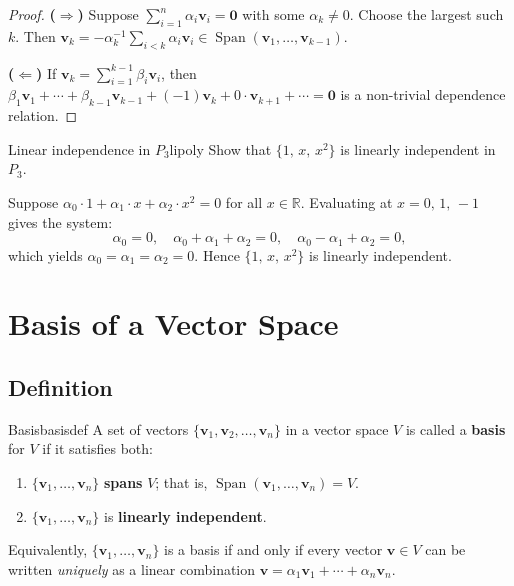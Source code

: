 \documentclass[12pt,a4paper]{article}
\newcommand{\R}{\mathbb{R}}
\newcommand{\vv}[1]{\mathbf{#1}}
\newcommand{\vzero}{\mathbf{0}}
\DeclareMathOperator{\Span}{Span}
\begin{document}
		\begin{proof}
			\textbf{($\Rightarrow$)}\; Suppose $\sum_{i=1}^n \alpha_i\vv{v}_i = \vzero$
			with some $\alpha_k \neq 0$.  Choose the largest such $k$.  Then
			$\vv{v}_k = -\alpha_k^{-1}\sum_{i < k}\alpha_i\vv{v}_i
			\in \Span(\vv{v}_1,\ldots,\vv{v}_{k-1})$.
			
			\textbf{($\Leftarrow$)}\; If $\vv{v}_k = \sum_{i=1}^{k-1}\beta_i\vv{v}_i$,
			then $\beta_1\vv{v}_1 + \cdots + \beta_{k-1}\vv{v}_{k-1}
			+ (-1)\vv{v}_k + 0\cdot\vv{v}_{k+1} + \cdots = \vzero$
			is a non-trivial dependence relation.
		\end{proof}
		
		\begin{example}{Linear independence in $P_3$}{lipoly}
			Show that $\{1,\, x,\, x^2\}$ is linearly independent in $P_3$.
			
			Suppose $\alpha_0 \cdot 1 + \alpha_1 \cdot x + \alpha_2 \cdot x^2 = 0$
			for all $x \in \R$.  Evaluating at $x = 0,\, 1,\, -1$ gives the system:
			\[
			\alpha_0 = 0,
			\quad
			\alpha_0 + \alpha_1 + \alpha_2 = 0,
			\quad
			\alpha_0 - \alpha_1 + \alpha_2 = 0,
			\]
			which yields $\alpha_0 = \alpha_1 = \alpha_2 = 0$.
			Hence $\{1,\, x,\, x^2\}$ is linearly independent.
		\end{example}
		
		\section{Basis of a Vector Space}
		\label{sec:basis}
		
		\subsection{Definition}
		
		\begin{definition}{Basis}{basisdef}
			A set of vectors $\{\vv{v}_1, \vv{v}_2, \ldots, \vv{v}_n\}$ in a vector
			space $V$ is called a \textbf{basis} for $V$ if it satisfies both:
			\begin{enumerate}[label=(\roman*), leftmargin=2.5em]
				\item $\{\vv{v}_1, \ldots, \vv{v}_n\}$ \textbf{spans} $V$; that is,
				$\Span(\vv{v}_1, \ldots, \vv{v}_n) = V$.
				\item $\{\vv{v}_1, \ldots, \vv{v}_n\}$ is \textbf{linearly independent}.
			\end{enumerate}
			Equivalently, $\{\vv{v}_1, \ldots, \vv{v}_n\}$ is a basis if and only if
			every vector $\vv{v} \in V$ can be written \emph{uniquely} as a linear
			combination $\vv{v} = \alpha_1\vv{v}_1 + \cdots + \alpha_n\vv{v}_n$.
		\end{definition}
		
\end{document}
